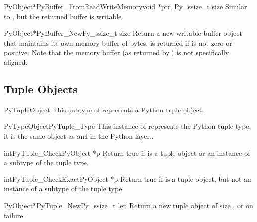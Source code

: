 \begin{cfuncdesc}{PyObject*}{PyBuffer_FromReadWriteMemory}{void *ptr, Py_ssize_t size}
  Similar to , but the returned
  buffer is writable.
\end{cfuncdesc}

\begin{cfuncdesc}{PyObject*}{PyBuffer_New}{Py_ssize_t size}
  Return a new writable buffer object that maintains its own memory
  buffer of  bytes.   is returned if
   is not zero or positive.  Note that the memory buffer (as
  returned by ) is not specifically
  aligned.
\end{cfuncdesc}


\subsection{Tuple Objects \label{tupleObjects}}

\begin{ctypedesc}{PyTupleObject}
  This subtype of  represents a Python tuple object.
\end{ctypedesc}

\begin{cvardesc}{PyTypeObject}{PyTuple_Type}
  This instance of  represents the Python tuple
  type; it is the same object as  and 
  in the Python layer..
\end{cvardesc}

\begin{cfuncdesc}{int}{PyTuple_Check}{PyObject *p}
  Return true if  is a tuple object or an instance of a subtype
  of the tuple type.
\end{cfuncdesc}

\begin{cfuncdesc}{int}{PyTuple_CheckExact}{PyObject *p}
  Return true if  is a tuple object, but not an instance of a
  subtype of the tuple type.
\end{cfuncdesc}

\begin{cfuncdesc}{PyObject*}{PyTuple_New}{Py_ssize_t len}
  Return a new tuple object of size , or \NULL{} on failure.
\end{cfuncdesc}

